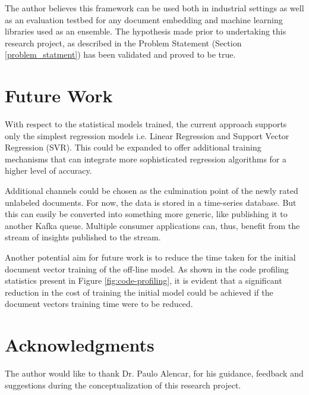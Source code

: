 \documentclass[conference]{IEEEtran}
\begin{document}
    The author believes this framework can be used both in industrial settings as well as an evaluation testbed for any document embedding and machine learning libraries used as an ensemble. The hypothesis made prior to undertaking this research project, as described in the Problem Statement (Section \ref{problem_statment}) has been validated and proved to be true.

\vspace{5mm}

\section{Future Work}
    With respect to the statistical models trained, the current approach supports only the simplest regression models i.e. Linear Regression and Support Vector Regression (SVR). 
    This could be expanded to offer additional training mechanisms that can integrate more sophisticated regression algorithms for a higher level of accuracy.
     
    Additional channels could be chosen as the culmination point of the newly rated unlabeled documents.
    For now, the data is stored in a time-series database.
    But this can easily be converted into something more generic, like publishing it to another Kafka queue.
    Multiple consumer applications can, thus, benefit from the stream of insights published to the stream.

    Another potential aim for future work is to reduce the time taken for the initial document vector training of the off-line model.
    As shown in the code profiling statistics present in Figure \ref{fig:code-profiling}, it is evident that a significant reduction in the cost of training the initial model could be achieved if the document vectors training time were to be reduced.

\vspace{5mm}

\section{Acknowledgments}
    The author would like to thank Dr. Paulo Alencar, for his guidance, feedback and suggestions during the conceptualization of this research project.

\vspace{5mm}



\end{document}
